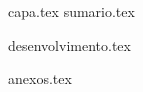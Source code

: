 \documentclass[
	12pt,				%
	oneside,			%
	a4paper,			%
	chapter=TITLE,
	sumario=tradicional,
	english,			%
	brazil				%
]{abntex2}
\begin{document}

\frenchspacing 

{capa.tex}
{sumario.tex}

\textual

\pagestyle{simple}

\begin{SingleSpace}
	
{desenvolvimento.tex}

\end{SingleSpace}

\postextual

{anexos.tex}
\end{document}
